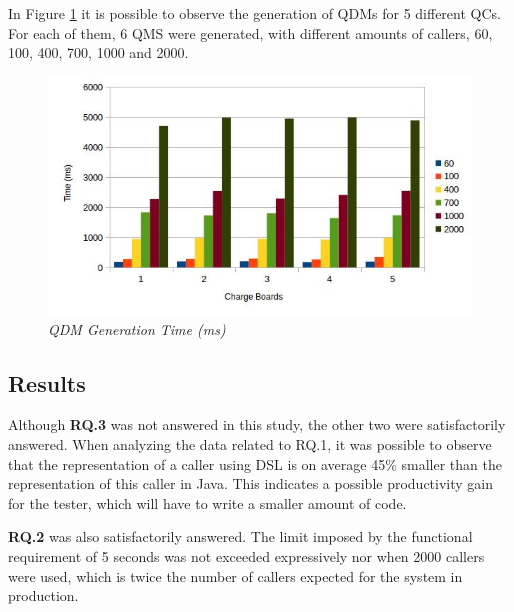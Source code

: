 
In Figure \ref{fig:geracao} it is possible to observe the generation of QDMs for 5 different QCs. For each of them, 6 QMS were generated, with different amounts of callers, 60, 100, 400, 700, 1000 and 2000.

\begin{figure}[!ht] \centering
  \includegraphics[width=.45\textwidth]
  {img/artigo_geracao.jpg}
  \caption{\it QDM Generation Time (ms)}
  \label{fig:geracao}
\end{figure}

\subsection{Results}


Although \textbf{RQ.3} was not answered in this study, the other two were satisfactorily answered. When analyzing the data related to RQ.1, it was possible to observe that the representation of a caller using DSL is on average 45\% smaller than the representation of this caller in Java. This indicates a possible productivity gain for the tester, which will have to write a smaller amount of code.


\textbf{RQ.2} was also satisfactorily answered. The limit imposed by the functional requirement of 5 seconds was not exceeded expressively nor when 2000 callers were used, which is twice the number of callers expected for the system in production.

